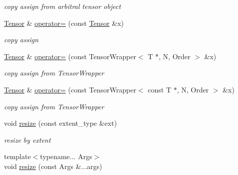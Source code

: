 \begin{DoxyCompactItemize}
\begin{DoxyCompactList}\small\item\em copy assign from arbitral tensor object \item\end{DoxyCompactList}\item 
\hypertarget{classbtas_1_1_tensor_a8a448dee7c514e1cdd4e03c0e2067843}{
\hyperlink{classbtas_1_1_tensor}{Tensor} \& \hyperlink{classbtas_1_1_tensor_a8a448dee7c514e1cdd4e03c0e2067843}{operator=} (const \hyperlink{classbtas_1_1_tensor}{Tensor} \&x)}
\label{classbtas_1_1_tensor_a8a448dee7c514e1cdd4e03c0e2067843}

\begin{DoxyCompactList}\small\item\em copy assign \item\end{DoxyCompactList}\item 
\hypertarget{classbtas_1_1_tensor_a0dd1b8767274a6a401bbd07b6972eed7}{
\hyperlink{classbtas_1_1_tensor}{Tensor} \& \hyperlink{classbtas_1_1_tensor_a0dd1b8767274a6a401bbd07b6972eed7}{operator=} (const TensorWrapper$<$ T $\ast$, N, Order $>$ \&x)}
\label{classbtas_1_1_tensor_a0dd1b8767274a6a401bbd07b6972eed7}

\begin{DoxyCompactList}\small\item\em copy assign from TensorWrapper \item\end{DoxyCompactList}\item 
\hypertarget{classbtas_1_1_tensor_a362421a23b01856e56262c9ac0a0b342}{
\hyperlink{classbtas_1_1_tensor}{Tensor} \& \hyperlink{classbtas_1_1_tensor_a362421a23b01856e56262c9ac0a0b342}{operator=} (const TensorWrapper$<$ const T $\ast$, N, Order $>$ \&x)}
\label{classbtas_1_1_tensor_a362421a23b01856e56262c9ac0a0b342}

\begin{DoxyCompactList}\small\item\em copy assign from TensorWrapper \item\end{DoxyCompactList}\item 
\hypertarget{classbtas_1_1_tensor_a7427ad01419cb58d554bfac1a70ceb0d}{
void \hyperlink{classbtas_1_1_tensor_a7427ad01419cb58d554bfac1a70ceb0d}{resize} (const extent\_\-type \&ext)}
\label{classbtas_1_1_tensor_a7427ad01419cb58d554bfac1a70ceb0d}

\begin{DoxyCompactList}\small\item\em resize by extent \item\end{DoxyCompactList}\item 
\hypertarget{classbtas_1_1_tensor_a52a81b63178a9a412554698ef88ab932}{
{\footnotesize template$<$typename... Args$>$ }\\void \hyperlink{classbtas_1_1_tensor_a52a81b63178a9a412554698ef88ab932}{resize} (const Args \&...args)}
\label{classbtas_1_1_tensor_a52a81b63178a9a412554698ef88ab932}


\end{DoxyCompactItemize}
